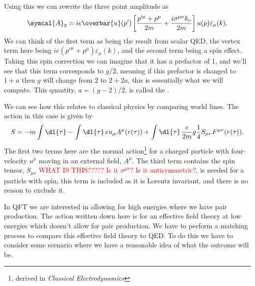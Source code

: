 \documentclass[fleqn]{NotesClass}
\newcommand*{\course}[1]{\textit{#1}}
\newcommand{\diracadjoint}[1]{\overbar{#1}}
\newcommand{\amplitude}{\symcal{A}}
\begin{document}
    Using this we can rewrite the three point amplitude as
    \begin{equation}
        \amplitude_3 = ie\diracadjoint{u}(p')\left[ \frac{p'^\mu + p^\mu}{2m} + \frac{i\sigma^{\mu\nu}k_\nu}{2m} \right] u(p) \varepsilon_\mu(k).
    \end{equation}
    We can think of the first term as being the result from scalar QED, the vertex term here being \(ie(p'^\mu + p^\mu)\varepsilon_\mu(k)\), and the second term being a spin effect.
    Taking this spin correction we can imagine that it has a prefactor of 1, and we'll see that this term corresponds to \(g/2\), meaning if this prefactor is changed to \(1 + a\) then \(g\) will change from \(2\) to \(2 + 2a\), this is essentially what we will compute.
    This quantity, \(a = (g - 2)/2\), is called the .
    
    We can see how this relates to classical physics by comparing world lines.
    The action in this case is given by
    \begin{equation}
        S = -m \int \dl{\tau} - \int \dl{\tau} \, e u_\mu A^\mu(r(\tau)) + \int \dl{\tau} \, \frac{e}{2m} g \frac{1}{4}S_{\mu\nu}F^{\mu\nu}(r(\tau)).
    \end{equation}
    The first two terms here are the normal action\footnote{derived in \course{Classical Electrodynamics}} for a charged particle with four-velocity \(u^\mu\) moving in an external field, \(A^\mu\).
    The third term contains the spin tensor, \(S_{\mu\nu}\) \textcolor{red}{WHAT IS THIS????? Is it \(\sigma^{\mu\nu}\)? Is it antisymmetric?}, is needed for a particle with spin, this term is included as it is Lorentz invariant, and there is no reason to exclude it.
    
    In QFT we are interested in allowing for high energies where we have pair production.
    The action written down here is for an effective field theory at low energies which doesn't allow for pair production.
    We have to perform a matching process to compare this effective field theory to QED.
    To do this we have to consider some scenario where we have a reasonable idea of what the outcome will be.
    
\end{document}
